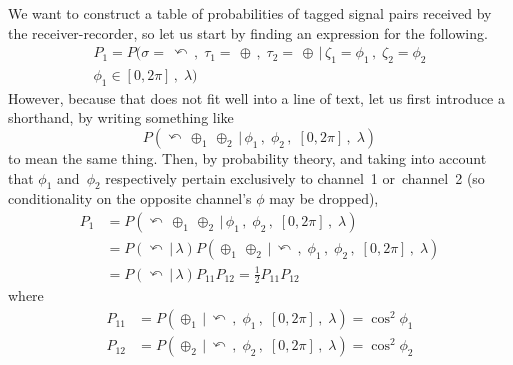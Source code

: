 \documentclass[9pt,technote]{IEEEtran}
\begin{document}
We want to construct a table of probabilities of tagged signal pairs
received by the receiver-recorder, so let us start by finding an
expression for the following.
\begin{multline}
  P_1 = P(\sigma=\,\curvearrowleft\,,\; \tau_1=\,\oplus\,,\; \tau_2=\,\oplus \,|\,
  \zeta_1=\phi_1\,,\; \zeta_2=\phi_2 \\ \phi_1\in[0,2\pi]\,,\; \lambda)
\end{multline}
However, because that does not fit well into a line of text, let us
first introduce a shorthand, by writing something like
\begin{equation}
  P(\curvearrowleft\,\oplus_1\,\oplus_2\,|\,\phi_1\,,\; \phi_2\,,\;
  [0,2\pi]\,,\; \lambda)
\end{equation}
to mean the same thing. Then, by probability theory, and taking into
account that $\phi_1$ and~$\phi_2$ respectively pertain exclusively to
channel~1 or~channel~2 (so conditionality on the opposite channel's
$\phi$ may be dropped),
\begin{align}
  P_1 &= P(\curvearrowleft\,\oplus_1\,\oplus_2\,|\,\phi_1\,,\; \phi_2\,,\; [0,2\pi]\,,\; \lambda) \\
      &= P(\curvearrowleft\,|\, \lambda) P(\oplus_1\,\oplus_2\,|\,\curvearrowleft\,,\;\phi_1\,,\; \phi_2\,,\; [0,2\pi]\,,\; \lambda) \\
      &= P(\curvearrowleft\,|\, \lambda) P_{11} P_{12} = \frac{1}{2} P_{11} P_{12}
\end{align}
where
\begin{align}
  P_{11} &= P(\oplus_1\,|\,\curvearrowleft\,,\;\phi_1\,,\; [0,2\pi]\,,\; \lambda) = \cos^2 \phi_1 \\
  P_{12} &= P(\oplus_2\,|\,\curvearrowleft\,,\; \phi_2\,,\; [0,2\pi]\,,\; \lambda) = \cos^2 \phi_2
\end{align}
\end{document}
